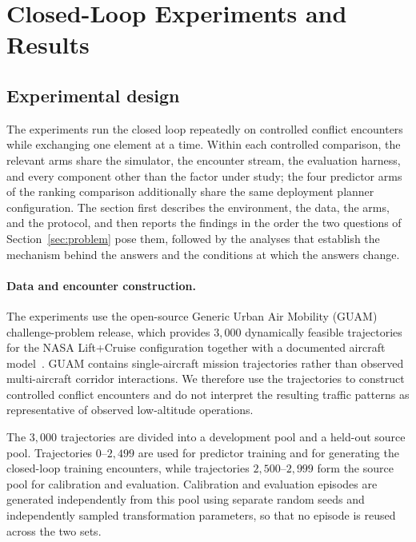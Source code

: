 \documentclass[11pt]{article}
\theoremstyle{plain}
\theoremstyle{definition}
\begin{document}
\section{Closed-Loop Experiments and Results}
\label{sec:experiments}

\subsection{Experimental design}
\label{sec:exp-design}

The experiments run the closed loop repeatedly on controlled conflict
encounters while exchanging one element at a time. Within each controlled comparison, the relevant arms share the
simulator, the encounter stream, the evaluation harness, and every
component other than the factor under study; the four predictor arms
of the ranking comparison additionally share the same deployment
planner configuration. The section first describes the environment, the data, the
arms, and the protocol, and then reports the findings in the order the
two questions of Section~\ref{sec:problem} pose them, followed by the
analyses that establish the mechanism behind the answers and the
conditions at which the answers change.

\paragraph{Data and encounter construction.}
The experiments use the open-source Generic Urban Air Mobility
(GUAM) challenge-problem release, which provides $3{,}000$
dynamically feasible trajectories for the NASA Lift+Cruise
configuration together with a documented aircraft
model~\citep{acheson2024guam,campbell2024pyguam}. GUAM contains
single-aircraft mission trajectories rather than observed
multi-aircraft corridor interactions. We therefore use the
trajectories to construct controlled conflict encounters and do not
interpret the resulting traffic patterns as representative of
observed low-altitude operations.

The $3{,}000$ trajectories are divided into a development pool and a
held-out source pool. Trajectories $0$--$2{,}499$ are used for
predictor training and for generating the closed-loop training
encounters, while trajectories $2{,}500$--$2{,}999$ form the source
pool for calibration and evaluation. Calibration and evaluation
episodes are generated independently from this pool using separate
random seeds and independently sampled transformation parameters, so
that no episode is reused across the two sets.
\end{document}
